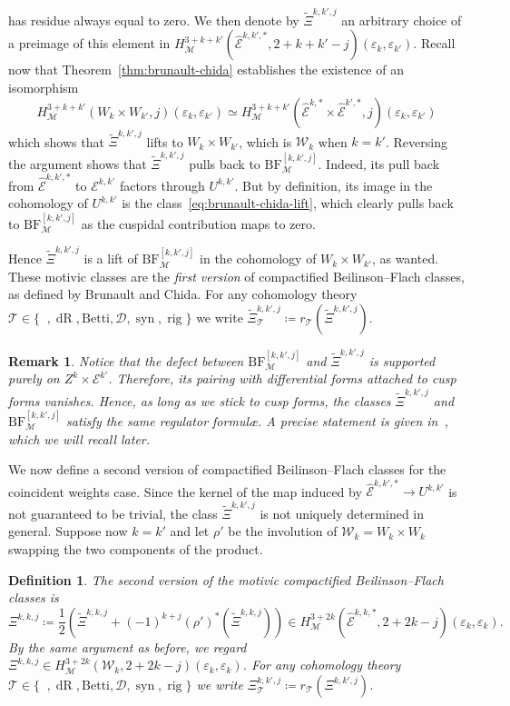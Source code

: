 \documentclass[10pt,a4paper]{amsart}
\newcommand{\BF}{\mathrm{BF}}
\newcommand{\Ell}{\mathcal{E}}
\newcommand{\KS}{\mathscr{W}}
\newcommand{\cBF}{\Xi}
\newcommand{\lcBF}{\widetilde{\Xi}}
\newcommand{\regulator}[1]{r_{#1}}
\DeclareMathOperator{\syn}{syn}
\DeclareMathOperator{\dR}{dR}
\newcommand{\del}{\mathcal{D}}
\renewcommand{\epsilon}{\varepsilon}
\DeclareMathOperator{\et}{\acute{e}t}
\DeclareMathOperator{\mot}{\mathscr{M}}
\DeclareMathOperator{\rig}{rig}
\newcommand{\theory}{\mathcal{T}}
\newtheorem{definition}{Definition}
\newtheorem{remark}{Remark}
\begin{document}
has residue always equal to zero. We then denote by $\lcBF^{k,k',j}$ an arbitrary choice of a preimage of this element in $H^{3+k+k'}_{\mot}(\hat{\Ell}^{k,k',*},2+k+k'-j)(\epsilon_k,\epsilon_{k'})$. Recall now that Theorem~\ref{thm:brunault-chida} establishes the existence of an isomorphism
\[
    H_{\mot}^{3+k+k'}(W_k \times W_{k'}, j)(\epsilon_k,\epsilon_{k'}) \simeq H_{\mot}^{3+k+k'}(\hat{\Ell}^{k,*} \times \hat{\Ell}^{k',*}, j)(\epsilon_k,\epsilon_{k'})
\]
which shows that $\lcBF^{k,k',j}$ lifts to $W_k\times W_{k'}$, which is $\KS_k$ when $k=k'$. Reversing the argument shows that $\lcBF^{k,k',j}$ pulls back to $\BF^{[k,k',j]}_{\mot}$. Indeed, its pull back from $\hat{\Ell}^{k,k',*}$ to $\Ell^{k,k'}$ factors through $U^{k,k'}$. But by definition, its image in the cohomology of $U^{k,k'}$ is the class~\eqref{eq:brunault-chida-lift}, which clearly pulls back to $\BF^{[k,k',j]}_{\mot}$ as the cuspidal contribution maps to zero.

Hence $\lcBF^{k,k',j}$ is a lift of $\BF^{[k,k',j]}_{\mot}$ in the cohomology of $W_k\times W_{k'}$, as wanted. These motivic classes are the \emph{first version} of compactified Beilinson--Flach classes, as defined by Brunault and Chida. For any cohomology theory $\theory\in\{\et,\dR,\mathrm{Betti},\del,\syn,\rig\}$ we write $\lcBF^{k,k',j}_{\theory} \coloneqq \regulator{\theory}(\lcBF^{k,k',j})$.
\begin{remark}
    \label{rmk:pairing-unchanged}
    Notice that the defect between $\BF^{[k,k',j]}_{\mot}$ and $\lcBF^{k,k',j}$ is supported purely on $Z^k\times \Ell^{k'}$. Therefore, its pairing with differential forms attached to cusp forms vanishes. Hence, as long as we stick to cusp forms, the classes $\lcBF^{k,k',j}$ and $\BF^{[k,k',j]}_{\mot}$ satisfy the same regulator formulæ. A precise statement is given in~\cite[Proposition~9.4]{brunaultchida16}, which we will recall later.
\end{remark}

We now define a second version of compactified Beilinson--Flach classes for the coincident weights case. Since the kernel of the map induced by $\hat{\Ell}^{k,k',*} \to U^{k,k'}$ is not guaranteed to be trivial, the class $\lcBF^{k,k',j}$ is not uniquely determined in general. Suppose now $k=k'$ and let $\rho'$ be the involution of $\KS_k = W_k\times W_k$ swapping the two components of the product.

 \begin{definition}
  The \emph{second version} of the motivic compactified Beilinson--Flach classes is
  \[
      \cBF^{k,k,j} \coloneqq \frac{1}{2}(\lcBF^{k,k,j} + (-1)^{k+j}(\rho')^*(\lcBF^{k,k,j})) \in H^{3+2k}_{\mot}(\hat{\Ell}^{k,k,*},2+2k-j)(\epsilon_k,\epsilon_k).
  \]
  By the same argument as before, we regard $\cBF^{k,k,j}\in H^{3+2k}_{\mot}(\KS_k,2+2k-j)(\epsilon_k,\epsilon_k)$. For any cohomology theory $\theory\in\{\et,\dR,\mathrm{Betti},\del,\syn,\rig\}$ we write $\cBF^{k,k',j}_{\theory} \coloneqq \regulator{\theory}(\cBF^{k,k',j})$.
 \end{definition}
\end{document}
